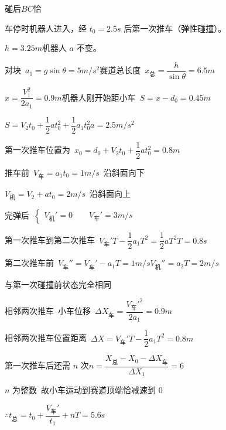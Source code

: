 碰后$BC$恰

车停时机器人进入，经 $t_0=2.5\unit{s}$ 后第一次推车（弹性碰撞）。%

$h=3.25\unit{m}$\quad 机器人 $a$ 不变。

对块\ $a_1=g\sin\theta=5\unit{m/s^2}$\qquad 赛道总长度\ $x_{\text{总}}=\dfrac{h}{\sin\theta}=6.5\unit{m}$

$x=\dfrac{V_1^2}{2a_1}=0.9\unit{m}$\qquad 机器人刚开始距小车\ $S=x-d_0=0.45\unit{m}$

$S=V_2t_0+\dfrac12at_0^2+\dfrac12a_1t_0^2$\qquad $a=2.5\unit{m/s^2}$

第一次推车位置为\ $x_0=d_0+V_2t_0+\dfrac12at_0^2=0.8\unit{m}$

推车前\ $V_{\text{车}}=a_1t_0=1\unit{m/s}$\ 沿斜面向下

$V_{\text{机}}=V_2+at_0=2\unit{m/s}$\ 沿斜面向上

完弹后\ $\left\{\begin{array}{l}V_{\text{机}}'=0\qquad V_{\text{车}}'=3\unit{m/s}\end{array}\right.$

第一次推车到第二次推车\ $V_{\text{车}}'T-\dfrac12a_1T^2=\dfrac12aT^2$\qquad $T=0.8\unit{s}$

第二次推车前\ $V_{\text{车}}''=V_{\text{车}}'-a_1T=1\unit{m/s}$\qquad $V_{\text{机}}''=a_2T=2\unit{m/s}$ %

与第一次碰撞前状态完全相同

相邻两次推车\ 小车位移\ $\Delta X_{\text{车}}=\dfrac{V_{\text{车}}'^2}{2a_1}=0.9\unit{m}$

相邻两次推车位置距离\ $\Delta X=V_{\text{车}}'T-\dfrac12a_1T^2=0.8\unit{m}$

第一次推车后还需 $n$ 次\qquad $n=\dfrac{X_{\text{总}}-X_0-\Delta X_{\text{车}}}{\Delta X_1}=6$

$n$ 为整数\ 故小车运动到赛道顶端恰减速到 $0$

$\therefore t_{\text{总}}=t_0+\dfrac{V_{\text{车}}'}{t_1}+nT=5.6\unit{s}$ %

